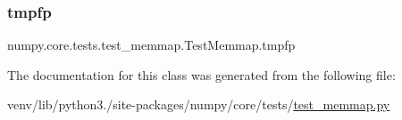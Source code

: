 \mbox{\label{classnumpy_1_1core_1_1tests_1_1test__memmap_1_1TestMemmap_a1a394ab8ef30a856fdd2c24226cf0789}} 
\subsubsection{\texorpdfstring{tmpfp}{tmpfp}}
{\footnotesize\ttfamily numpy.\+core.\+tests.\+test\+\_\+memmap.\+Test\+Memmap.\+tmpfp}



The documentation for this class was generated from the following file\+:\begin{DoxyCompactItemize}
\item 
venv/lib/python3./site-\/packages/numpy/core/tests/\hyperlink{test__memmap_8py}{test\+\_\+memmap.\+py}\end{DoxyCompactItemize}
